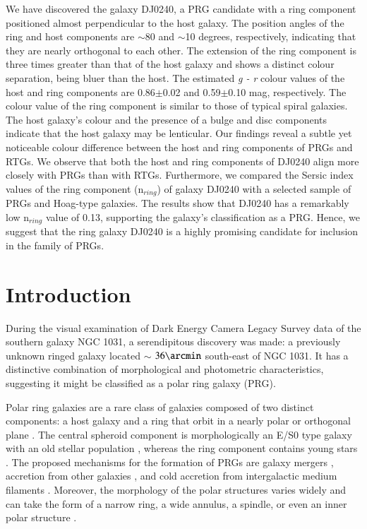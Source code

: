 \documentclass{aa}
\begin{document}
   {We have discovered the galaxy DJ0240, a PRG candidate with a ring component positioned almost perpendicular to the host galaxy. The position angles of the ring and host components are $\sim$80 and $\sim$10 degrees, respectively, indicating that they are nearly orthogonal to each other. The extension of the ring component is three times greater than that of the host galaxy and shows a distinct colour separation, being bluer than the host. The estimated {\it g - r} colour values of the host and ring components are 0.86$\pm$0.02 and 0.59$\pm$0.10 mag, respectively. The colour value of the ring component is similar to those of typical spiral galaxies. The host galaxy's colour and the presence of a bulge and disc components indicate that the host galaxy may be lenticular. Our findings reveal a subtle yet noticeable colour difference between the host and ring components of PRGs and RTGs. We observe that both the host and ring components of DJ0240 align more closely with PRGs than with RTGs. Furthermore, we compared the Sersic index values of the ring component (n$_{ring}$) of galaxy DJ0240 with a selected sample of PRGs and Hoag-type galaxies. The results show that DJ0240 has a remarkably low n$_{ring}$ value of 0.13, supporting the galaxy's classification as a PRG. Hence, we suggest that the ring galaxy DJ0240 is a highly promising candidate for inclusion in the family of PRGs. }
   {}

   \maketitle

\section{Introduction}
During the visual examination of Dark Energy Camera Legacy Survey \citep[DECaLS;][]{2019Dey} data of the southern galaxy NGC 1031, a serendipitous discovery was made: a previously unknown ringed galaxy located  $\sim$ $36\arcmin $ south-east of NGC 1031. It has a distinctive combination of morphological and photometric characteristics, suggesting it might be classified as a polar ring galaxy (PRG).

Polar ring galaxies are a rare class of galaxies composed of two distinct components: a host galaxy and a ring that orbit in a nearly polar or orthogonal plane \citep{whitmore1990}. The central spheroid component is morphologically an E/S0 type galaxy with an old stellar population \citep{2015Reshetnikov}, whereas the ring component contains young stars {\citep{2002Iodice}}. The proposed mechanisms for the formation of PRGs are galaxy mergers \citep{1998kenjibekki,2003Bournaudcombes}, accretion from other galaxies \citep{reshkinov1997,2003Bournaudcombes}, and cold accretion from intergalactic medium filaments \citep{2006macci,2008Brook}. Moreover, the morphology of the polar structures varies widely and can take the form of a narrow ring, a wide annulus, a spindle, or even an inner polar structure \citep{2014Iodice}.
\end{document}
